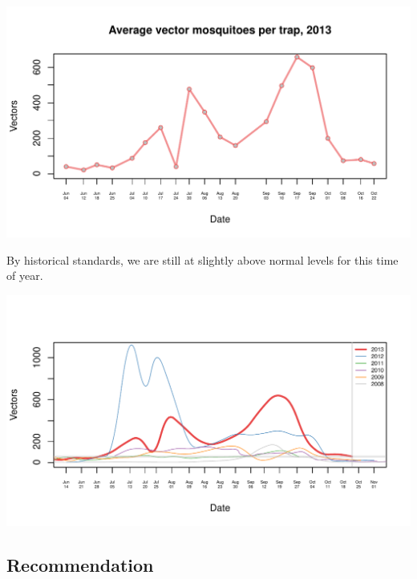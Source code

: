 \documentclass{article}
\begin{document}
\begin{center}
\includegraphics{mosq28oct13-003}
\end{center}
By historical standards, we are still at slightly above normal levels for this time of year.
\begin{center}
\includegraphics{mosq28oct13-004}
\end{center}
\subsection*{Recommendation}
\end{document}
